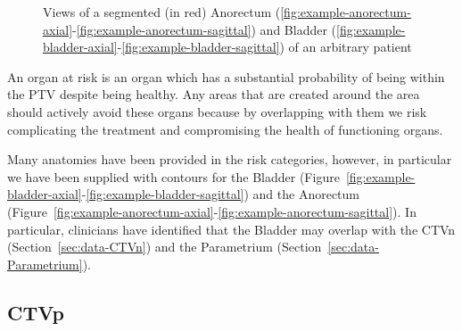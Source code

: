 \documentclass[11pt,twoside]{report}
\begin{document}
\begin{figure}[H]
{    \label{fig:example-bladder-coronal}
  }
  \caption{Views of a segmented (in red) Anorectum (\ref{fig:example-anorectum-axial}-\ref{fig:example-anorectum-sagittal}) and Bladder (\ref{fig:example-bladder-axial}-\ref{fig:example-bladder-sagittal}) of an arbitrary patient}
\end{figure}

An organ at risk is an organ which has a substantial probability of being within the PTV despite being healthy. Any areas that are created around the area should actively avoid these organs because by overlapping with them we risk complicating the treatment and compromising the health of functioning organs.

Many anatomies have been provided in the risk categories, however, in particular we have been supplied with contours for the Bladder (Figure~\ref{fig:example-bladder-axial}-\ref{fig:example-bladder-sagittal}) and the Anorectum (Figure~\ref{fig:example-anorectum-axial}-\ref{fig:example-anorectum-sagittal}). In particular, clinicians have identified that the Bladder may overlap with the CTVn (Section~\ref{sec:data-CTVn}) and the Parametrium (Section~\ref{sec:data-Parametrium}).

\subsection{CTVp}\label{sec:data-CTVp}
\end{document}
